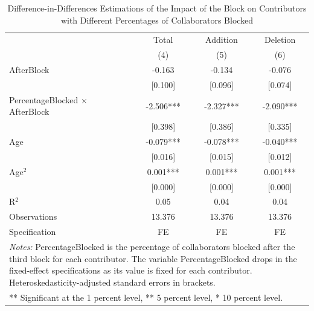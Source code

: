 \begin{table}[htbp]
\centering
\small
\def\sym#1{\ifmmode^{#1}\else\(^{#1}\)\fi}
\caption{Difference-in-Differences Estimations of the Impact of the Block on
Contributors with Different Percentages of Collaborators Blocked}
\label{tab:table4}
\begin{tabular}{l*{3}{c}}
\toprule
& \multicolumn{1}{c}{Total}
& \multicolumn{1}{c}{Addition}
& \multicolumn{1}{c}{Deletion} \\
& (4) & (5) & (6) \\
\midrule
AfterBlock  &      -0.163   &      -0.134   &      -0.076   \\
            &     [0.100]   &     [0.096]   &     [0.074]   \\
PercentageBlocked $\times$ AfterBlock&      -2.506***&      -2.327***&      -2.090***\\
            &     [0.398]   &     [0.386]   &     [0.335]   \\
Age         &      -0.079***&      -0.078***&      -0.040***\\
            &     [0.016]   &     [0.015]   &     [0.012]   \\
Age$^2$     &       0.001***&       0.001***&       0.001***\\
            &     [0.000]   &     [0.000]   &     [0.000]   \\
\midrule
R$^2$       &        0.05   &        0.04   &        0.04   \\
Observations&      13.376   &      13.376   &      13.376   \\
Specification & FE & FE & FE \\
\bottomrule
\multicolumn{4}{p{0.92\linewidth}}{\footnotesize \textit{Notes:}
 PercentageBlocked is the percentage of collaborators blocked after the
 third block for each contributor. The variable PercentageBlocked drops
 in the fixed-effect specifications as its value is fixed for each
 contributor. Heteroskedasticity-adjusted standard errors in brackets.} \\
\multicolumn{4}{l}{\footnotesize *** Significant at the 1 percent level,
 ** 5 percent level, * 10 percent level.} \\
\end{tabular}
\end{table}
